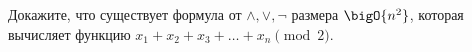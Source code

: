 Докажите, что существует формула от $\land, \lor, \neg$ размера $\bigO{n^2}$, которая вычисляет функцию
$x_1 + x_2 + x_3 + \dots + x_n \pmod 2$.

